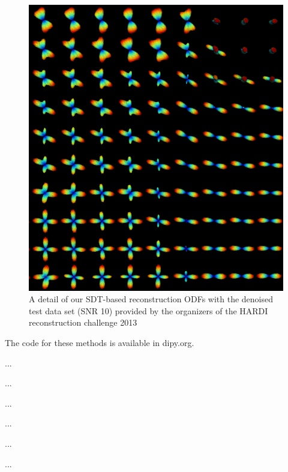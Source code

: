 \documentclass[9pt,conference,a4paper]{IEEEtran}
\begin{document}
\begin{figure}[h]
\begin{centering}
\includegraphics{sdt_test_snr10}
\end{centering}
\caption{A detail of our SDT-based reconstruction ODFs with the denoised test data set (SNR 10) provided by the organizers of the HARDI reconstruction challenge 2013}
\end{figure}



The code for these methods is available in dipy.org.

...

...

...

...

...

...



\end{document}

